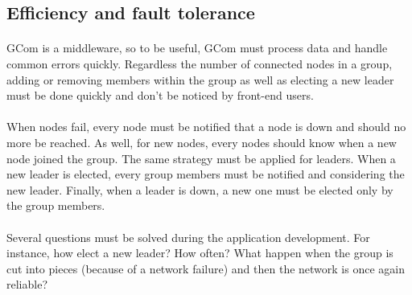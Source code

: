 \subsection{Efficiency and fault tolerance}

\paragraph{}{
	GCom is a middleware, so to be useful, GCom must process
 data and handle common errors quickly. Regardless the number 
 of connected nodes in a group, adding or removing members within
 the group as well as electing a new leader must be done
 quickly and don't be noticed by front-end users.
}

\paragraph{}{
	When nodes fail, every node must be notified that a node
 is down and should no more be reached. As well, for new nodes,
 every nodes should know when a new node joined the group. The
 same strategy must be applied for leaders. When a new leader is
 elected, every group members must be notified and considering
 the new leader. Finally, when a leader is down, a new one must
 be elected only by the group members.
}

\paragraph{}{
	Several questions must be solved during the application
 development. For instance, how elect a new leader? How often?
 What happen when the group is cut into pieces (because of a
 network failure) and then the network is once again reliable?
}
